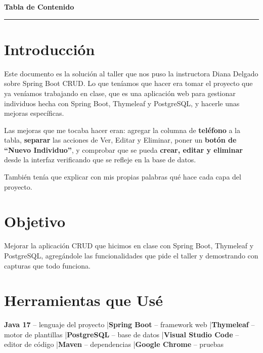 \documentclass[12pt, letterpaper]{article}
\begin{document}
\newpage
\begin{center}
    {\Large\bfseries\color{verde} Tabla de Contenido}\\[4pt]
    \textcolor{verde!40}{\rule{4cm}{1pt}}
\end{center}
\vspace{0.4cm}
\tableofcontents
\newpage

\section{Introducci\'{o}n}

Este documento es la soluci\'{o}n al taller que nos puso la instructora Diana Delgado sobre Spring Boot CRUD. Lo que ten\'{i}amos que hacer era tomar el proyecto que ya ven\'{i}amos trabajando en clase, que es una aplicaci\'{o}n web para gestionar individuos hecha con Spring Boot, Thymeleaf y PostgreSQL, y hacerle unas mejoras espec\'{i}ficas.

Las mejoras que me tocaba hacer eran: agregar la columna de \textbf{tel\'{e}fono} a la tabla, \textbf{separar} las acciones de Ver, Editar y Eliminar, poner un \textbf{bot\'{o}n de ``Nuevo Individuo''}, y comprobar que se pueda \textbf{crear, editar y eliminar} desde la interfaz verificando que se refleje en la base de datos.

Tambi\'{e}n ten\'{i}a que explicar con mis propias palabras qu\'{e} hace cada capa del proyecto.

\section{Objetivo}

Mejorar la aplicaci\'{o}n CRUD que hicimos en clase con Spring Boot, Thymeleaf y PostgreSQL, agreg\'{a}ndole las funcionalidades que pide el taller y demostrando con capturas que todo funciona.

\section{Herramientas que Us\'{e}}

\begin{nota}
\textbf{Java 17} -- lenguaje del proyecto \quad|\quad \textbf{Spring Boot} -- framework web \quad|\quad \textbf{Thymeleaf} -- motor de plantillas \quad|\quad \textbf{PostgreSQL} -- base de datos \quad|\quad \textbf{Visual Studio Code} -- editor de c\'{o}digo \quad|\quad \textbf{Maven} -- dependencias \quad|\quad \textbf{Google Chrome} -- pruebas
\end{nota}
\end{document}
